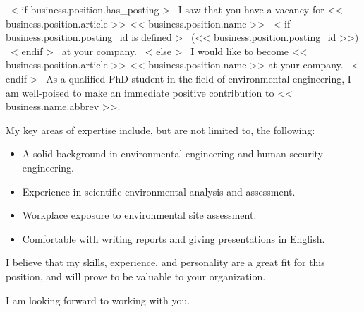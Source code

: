 ~< if business.position.has_posting >~
    I saw that you have a vacancy for << business.position.article >> << business.position.name >>
    ~< if business.position.posting_id is defined >~ (<< business.position.posting_id >>) ~< endif >~ at your company.
~< else >~
    I would like to become << business.position.article >> << business.position.name >> at your company.
~< endif >~
As a qualified PhD student in the field of environmental engineering, I am well-poised to make an immediate positive contribution to << business.name.abbrev >>.

My key areas of expertise include, but are not limited to, the following:

\begin{itemize}
    \item A solid background in environmental engineering and human security engineering.
	\item Experience in scientific environmental analysis and assessment.
	\item Workplace exposure to environmental site assessment.
	\item Comfortable with writing reports and giving presentations in English.
\end{itemize}


I believe that my skills, experience, and personality are a great fit for this position, and will prove to be valuable to your organization.

I am looking forward to working with you.
